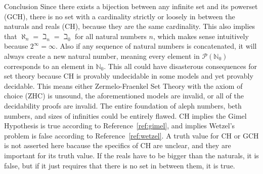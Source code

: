 \documentclass[12pt]{article}
\begin{document}
\begin{section}{Conclusion}\label{sec:conclusion}
	Since there exists a bijection between any infinite set and its powerset (GCH), there is no
	set with a cardinality strictly or loosely in between the naturals and reals (CH), because
	they are the same cardinality. This also implies that $\aleph_n=\beth_n=\beth_0$ for all
	natural numbers $n$, which makes sense intuitively because $2^\infty=\infty$. Also if any
	sequence of natural numbers is concatenated, it will always create a new natural number,
	meaning every element in $\mathcal P(\mathbb N_0)$ corresponds to an element in
	$\mathbb N_0$. This all could have disasterous consequences for set theory because CH is
	provably undecidable in some models and yet provably decidable. This means either
	Zermelo-Fraenkel Set Theory with the axiom of choice (ZHC) is unsound, the aforementioned
	models are invalid, or all of the decidability proofs are invalid. The entire foundation of
	aleph numbers, beth numbers, and sizes of infinities could be entirely flawed. CH implies
	the Gimel Hypothesis is true according to Reference~\ref{ref:gimel}, and implies Wetzel's
	problem is false according to Reference~\ref{ref:wetzel}. A truth value for CH or GCH is
	not asserted here bacause the specifics of CH are unclear, and they are important for its
	truth value. If the reals have to be bigger than the naturals, it is false, but if it just
	requires that there is no set in between them, it is true.
\end{section}
\end{document}
